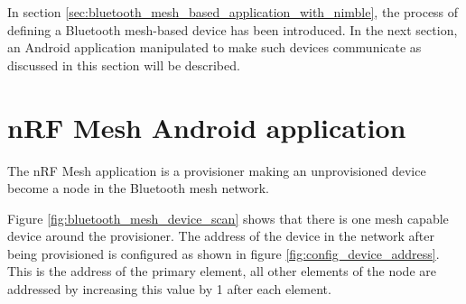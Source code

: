 \documentclass[\main/main.tex]{subfiles}
\begin{document}
In section \ref{sec:bluetooth_mesh_based_application_with_nimble}, the process of defining a Bluetooth mesh-based device has been introduced. In the next section, an Android application manipulated to make such devices communicate as discussed in this section will be described.
\section{nRF Mesh Android application}
The nRF Mesh application is a provisioner making an unprovisioned device become a node in the Bluetooth mesh network. 

Figure \ref{fig:bluetooth_mesh_device_scan} shows that there is one mesh capable device around the provisioner. The address of the device in the network after being provisioned is configured as shown in figure \ref{fig:config_device_address}. This is the address of the primary element, all other elements of the node are addressed by increasing this value by 1 after each element.
\end{document}
